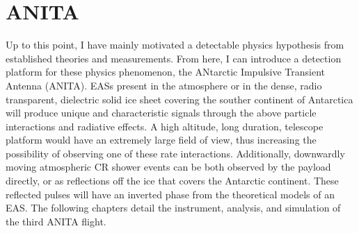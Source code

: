 \section{ANITA}
	Up to this point, I have mainly motivated a detectable physics hypothesis from established theories and measurements.  From here, I can introduce a detection platform for these physics phenomenon, the ANtarctic Impulsive Transient Antenna (ANITA).  EASs present in the atmosphere or in the dense, radio transparent, dielectric solid ice sheet covering the souther continent of Antarctica will produce unique and characteristic signals through the above particle interactions and radiative effects.  A high altitude, long duration, telescope platform would have an extremely large field of view, thus increasing the possibility of observing one of these rate interactions.  Additionally, downwardly moving atmospheric CR shower events can be both observed by the payload directly, or as reflections off the ice that covers the Antarctic continent.  These reflected pulses will have an inverted phase from the theoretical models of an EAS.  The following chapters detail the instrument, analysis, and simulation of the third ANITA flight.




